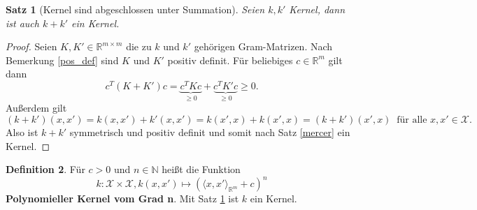 \documentclass{article}
\theoremstyle{plain}
\newtheorem{thm}{Satz}[subsection]
\theoremstyle{definition}
\newtheorem{dfn}[thm]{Definition}
\begin{document}
    \begin{thm}[Kernel sind abgeschlossen unter Summation] \label{thm:kernel_sum}
        Seien $k, k'$ Kernel, dann ist auch $k + k'$ ein Kernel.
    \end{thm}
    \begin{proof}
        Seien $K, K' \in \mathbb{R}^{m \times m}$ die zu $k$ und $k'$ gehörigen Gram-Matrizen. Nach Bemerkung \ref{pos_def} sind $K$ und $K'$ positiv definit.
        Für beliebiges $c \in \mathbb{R}^{m}$ gilt dann
        \[
            c^{T} (K + K') c
            =
            \underbrace{c^{T} K c}_{\geq 0} + \underbrace{c^{T} K' c}_{\geq 0} \geq 0.
        \]
        Außerdem gilt
        \[
        (k + k')(x,x')
        =
        k(x, x') + k'(x,x')
        =
        k(x', x) + k(x', x)
        =
        (k + k')(x',x)
        \ \text{ für alle $x,x' \in \mathcal{X}$}.
        \]
        Also ist $k + k'$ symmetrisch und positiv definit und somit nach Satz \ref{mercer} ein Kernel.
    \end{proof}
    
    \begin{dfn} \label{dfn:polynomial_kernel}
        Für $c >0$ und $n \in \mathbb{N}$ heißt die Funktion
        \[
            k: \mathcal{X} \times \mathcal{X}, k(x,x') \mapsto (\langle x, x' \rangle_{\mathbb{R}^{m}} + c)^{n}
        \]
        \textbf{Polynomieller Kernel vom Grad n}. Mit Satz \ref{thm:kernel_sum} ist $k$ ein Kernel.
    \end{dfn}
    
\end{document}
